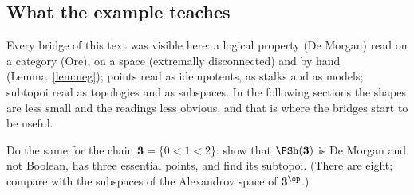 \subsection{What the example teaches}

Every bridge of this text was visible here: a logical property (De Morgan) read on a category (Ore), on a space (extremally disconnected) and by hand (Lemma~\ref{lem:neg}); points read as idempotents, as stalks and as models; subtopoi read as topologies and as subspaces. In the following sections the shapes are less small and the readings less obvious, and that is where the bridges start to be useful.

\begin{exercise}\label{exo:three}
Do the same for the chain $\mathbf 3 = \{0<1<2\}$: show that $\PSh(\mathbf 3)$ is De Morgan and not Boolean, has three essential points, and find its subtopoi. (There are eight; compare with the subspaces of the Alexandrov space of $\mathbf 3^{\op}$.)
\end{exercise}
